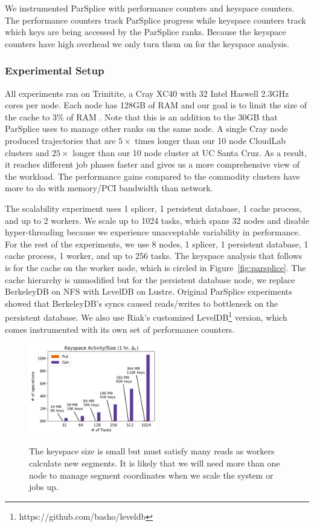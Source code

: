 We instrumented ParSplice with performance counters and keyspace counters.  The
performance counters track ParSplice progress while keyspace counters track
which keys are being accessed by the ParSplice ranks. Because the keyspace
counters have high overhead we only turn them on for the keyspace analysis.

\subsubsection*{Experimental Setup} All experiments ran on Trinitite, a Cray
XC40 with 32 Intel Haswell 2.3GHz cores per node.  Each node has 128GB of RAM
and our goal is to limit the size of the cache to 3\% of RAM . Note that this
is an addition to the 30GB that ParSplice uses to manage other ranks on the
same node.  A single Cray node produced trajectories that are \(5\times\) times
longer than our 10 node CloudLab clusters and \(25\times\) longer than our 10
node cluster at UC Santa Cruz. As a result, it reaches different job phases faster and
gives us a more comprehensive view of the workload. The performance gains
compared to the commodity clusters have more to do with memory/PCI bandwidth
than network.

The scalability experiment uses 1 splicer, 1 persistent database, 1 cache
process, and up to 2 workers. We scale up to 1024 tasks, which spans 32 nodes
and disable hyper-threading because we experience unacceptable variability in
performance. For the rest of the experiments, we use 8 nodes, 1 splicer, 1
persistent database, 1 cache process, 1 worker, and up to 256 tasks.  The
keyspace analysis that follows is for the cache on the worker node, which is
circled in Figure~\ref{fig:parsplice}.  The cache hierarchy is unmodified but
for the persistent database node, we replace BerkeleyDB on NFS with LevelDB on
Lustre. Original ParSplice experiments showed that BerkeleyDB's syncs caused
reads/writes to bottleneck on the persistent database. We also use Riak's
customized LevelDB\footnote{https://github.com/basho/leveldb} version, which
comes instrumented with its own set of performance counters.

\begin{figure}[t]
  \noindent\includegraphics[width=0.5\textwidth]{figures/methodology-keyspace.png}\\
  \caption{The keyspace size is small but must satisfy many reads as workers
  calculate new segments. It is likely that we will need
  more than one node to manage segment coordinates when we scale the system or jobs up.
  \label{fig:methodology-keyspace}}
\end{figure}

